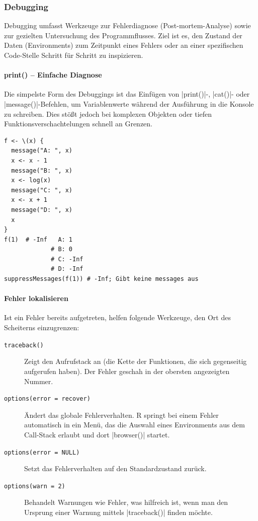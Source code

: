 \documentclass[10pt,twocolumn]{scrartcl}
\renewcommand{\lstinline}{\mycoloredinline}
\begin{document}
\subsubsection{Debugging}

Debugging umfasst Werkzeuge zur Fehlerdiagnose (Post-mortem-Analyse) sowie zur gezielten Untersuchung des Programmflusses. Ziel ist es, den Zustand der Daten (Environments) zum Zeitpunkt eines Fehlers oder an einer spezifischen Code-Stelle Schritt für Schritt zu inspizieren.

\paragraph{print() -- Einfache Diagnose}

Die simpelste Form des Debuggings ist das Einfügen von \lstinline|print()|-, \lstinline|cat()|- oder \lstinline|message()|-Befehlen, um Variablenwerte während der Ausführung in die Konsole zu schreiben. Dies stößt jedoch bei komplexen Objekten oder tiefen Funktionsverschachtelungen schnell an Grenzen.

\begin{lstlisting}
f <- \(x) {
  message("A: ", x)
  x <- x - 1
  message("B: ", x)
  x <- log(x)
  message("C: ", x)
  x <- x + 1
  message("D: ", x)
  x
}
f(1)  # -Inf   A: 1
             # B: 0
             # C: -Inf
             # D: -Inf
suppressMessages(f(1)) # -Inf; Gibt keine messages aus
\end{lstlisting}

\paragraph{Fehler lokalisieren}

Ist ein Fehler bereits aufgetreten, helfen folgende Werkzeuge, den Ort des Scheiterns einzugrenzen:

\begin{description}
\item[\texttt{traceback()}] Zeigt den Aufrufstack an (die Kette der Funktionen, die sich gegenseitig aufgerufen haben). Der Fehler geschah in der obersten angezeigten Nummer.
\item[\texttt{options(error = recover)}] Ändert das globale Fehlerverhalten. R springt bei einem Fehler automatisch in ein Menü, das die Auswahl eines Environments aus dem Call-Stack erlaubt und dort \lstinline|browser()| startet.
\item[\texttt{options(error = NULL)}] Setzt das Fehlerverhalten auf den Standardzustand zurück.
\item[\texttt{options(warn = 2)}] Behandelt Warnungen wie Fehler, was hilfreich ist, wenn man den Ursprung einer Warnung mittels \lstinline|traceback()| finden möchte.
\end{description}
\end{document}
